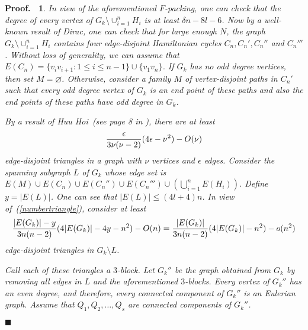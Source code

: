 \documentclass[11pt]{article}
\newtheorem{preproof}{{\bf Proof.\ }}
\newenvironment{proof}[1]{\begin{preproof}{\rm
               #1}\hfill{$\blacksquare$}}{\end{preproof}}
\begin{document}
\begin{proof}
{In view of the aforementioned $F$-packing, one can check that the degree of every vertex of $G_k \setminus\displaystyle\cup_{i=1}^n H_i$ is 
at least $\delta n-8l-6$. Now by a well-known result of Dirac, one can check that for large enough $N$, the graph 
$G_k \setminus\displaystyle\cup_{i=1}^n H_i$ contains four edge-disjoint Hamiltonian cycles $C_n, C_n', C_n''$ and $C_n'''$. 
Without loss of generality, we can assume that $E(C_n)=\{v_iv_{i+1}: 1\leq i\leq n-1\}\cup\{v_1v_n\}$.
If $G_k$ has no odd degree vertices, then set $M=\varnothing$. 
Otherwise, consider a family $M$ of vertex-disjoint paths in $C_n'$ such that every odd degree vertex of $G_k$ is an end point of these paths and also the end points of these paths have odd degree in $G_k$. 

By a result of Huu Hoi~(see page 8 in \cite{HHHoi}), there are at least 
\begin{equation}\label{numbertriangle}
{\epsilon\over 3\nu(\nu-2)}(4\epsilon-\nu^2)-O(\nu)
\end{equation}
edge-disjoint triangles in a graph with $\nu$ vertices and $\epsilon$ edges. Consider the spanning subgraph $L$ of $G_k$ whose edge set is  
$E(M)\cup E(C_n) \cup E(C_n'')\cup E(C_n''')\cup(\displaystyle\bigcup_{i=1}^nE(H_i))$.  
Define $y=|E(L)|$. One can see that $|E(L)|\leq (4l+4)n$. In view of~(\ref{numbertriangle}), consider at least 
\begin{equation}\label{numbertriangle2}
{|E(G_k)|-y\over 3n(n-2)}(4|E(G_k)|-4y-n^2)-O(n)=
{|E(G_k)|\over 3n(n-2)}(4|E(G_k)|-n^2)-o(n^2)\end{equation}
edge-disjoint triangles in $G_k\setminus L$. 


Call each of these triangles  a $3$-block.
Let $G_k''$ be the graph obtained from $G_k$ by removing all edges in $L$ and
the aforementioned  $3$-blocks. Every vertex of $G_k''$ has an even degree, and therefore, every connected component of $G_k''$ is an Eulerian graph.
Assume that $Q_1, Q_2, \ldots, Q_s$ are connected components of $G_k''$. 

}
\end{proof}
\end{document}
